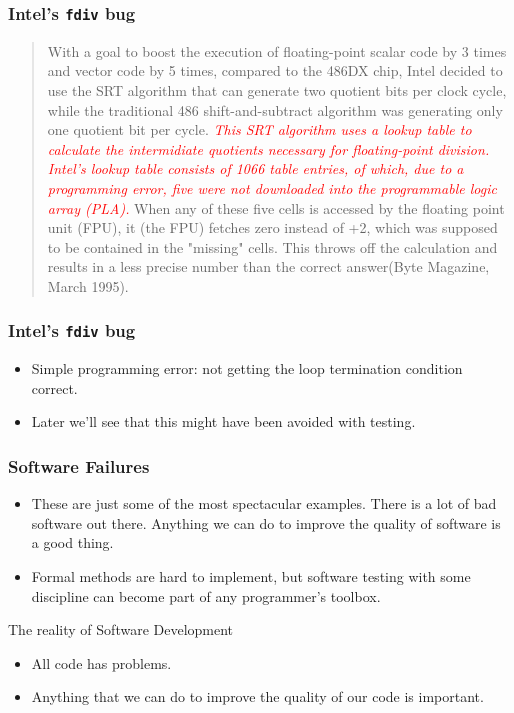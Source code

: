 \documentclass{beamer}
\begin{document}
\begin{frame}
  \frametitle{Intel's {\tt fdiv} bug}
  \begin{quote}
    With a goal to boost the execution of floating-point scalar code by 3
    times and vector code by 5 times, compared to the 486DX chip, Intel
    decided to use the SRT algorithm that can generate two quotient bits per
    clock cycle, while the traditional 486 shift-and-subtract algorithm was
    generating only one quotient bit per cycle. \textcolor{red}{\em This SRT
      algorithm uses a lookup table to calculate the intermidiate quotients
      necessary for floating-point division. Intel's lookup table consists of
      1066 table entries, of which, due to a programming error, five were not
      downloaded into the programmable logic array (PLA).} When any of these
    five cells is accessed by the floating point unit (FPU), it (the FPU)
    fetches zero instead of +2, which was supposed to be contained in the
    "missing" cells. This throws off the calculation and results in a less
    precise number than the correct answer(Byte Magazine, March 1995).
  \end{quote}
\end{frame}
\begin{frame}
  \frametitle{Intel's {\tt fdiv} bug}
  \begin{itemize}
  \item Simple programming error: not getting the loop termination
    condition correct.
  \item Later we'll see that this might have been avoided with testing.
  \end{itemize}
\end{frame}
\begin{frame}
  \frametitle{Software Failures}
  \begin{itemize}
  \item These are just some of the most spectacular examples. There is
    a lot of bad software out there. Anything we can do to
    improve the quality of software is a good thing. 
  \item  Formal methods are hard to implement, but
    software testing with some discipline can become part of any
    programmer's toolbox.
  \end{itemize}
\end{frame}

\begin{frame}{The reality of Software Development}
  \begin{itemize}
  \item All code has problems.
  \item Anything that we can do to improve the quality of our code is
    important.
    
  \end{itemize}
  
\end{frame}
\end{document}

